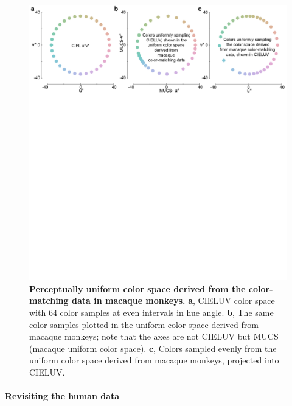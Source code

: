 \documentclass[9pt,biorxiv,lineno,onehalfspacing]{lapreprint}
\begin{document}
\begin{refsection}
\begin{figure}
    \begin{fullwidth}
    \centering
      \includegraphics[width=\textwidth+4cm,trim={0 15cm 0 0},clip]{Outputs/Paper/Figures/flat/F6_ColSpace_2}
           \caption{\textbf{Perceptually uniform color space derived from the color-matching data in macaque monkeys.} 
			\textbf{a}, CIELUV color space with 64 color samples at even intervals in hue angle. 
			\textbf{b}, The same color samples plotted in the uniform color space derived from macaque monkeys; note that the axes are not CIELUV but MUCS (macaque uniform color space). 
			\textbf{c}, Colors sampled evenly from the uniform color space derived from macaque monkeys, projected into CIELUV.}
		\label{fig:MACBEHcolorspace}
    \end{fullwidth}
\end{figure}

\paragraph{Revisiting the human data}


\end{refsection}
\end{document}
